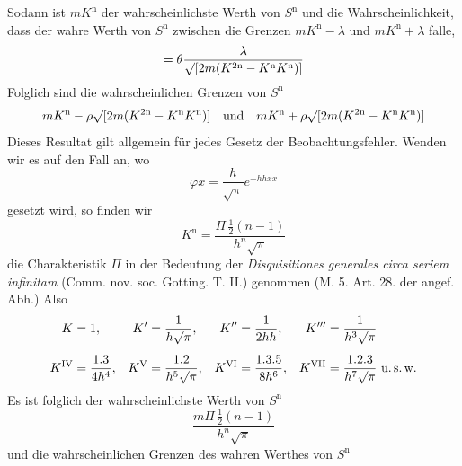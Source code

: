 Sodann ist \(mK^{\mathrm n}\) der wahrscheinlichste Werth von \(S^{\mathrm n}\) und die Wahrscheinlichkeit, dass der wahre Werth von \(S^{\mathrm n}\) zwischen die Grenzen \(mK^{\mathrm n}-\lambda\) und \(mK^{\mathrm n}+\lambda\) falle,
\[
=\theta\frac{\lambda}{\surd[2m(K^{2\mathrm n}-K^{\mathrm n}K^{\mathrm n})]}
\]
Folglich sind die wahrscheinlichen Grenzen von \(S^{\mathrm n}\)
\[
mK^{\mathrm n}-\rho\surd[2m(K^{2\mathrm n}-K^{\mathrm n}K^{\mathrm n})]\quad\text{und}\quad
mK^{\mathrm n}+\rho\surd[2m(K^{2\mathrm n}-K^{\mathrm n}K^{\mathrm n})]
\]
Dieses Resultat gilt allgemein für jedes Gesetz der Beobachtungsfehler. Wenden wir es auf den Fall an, wo
\[
\varphi x=\frac h{\surd\pi}e^{-hhxx}
\]
gesetzt wird, so finden wir
\[
K^{\mathrm n}=\frac{\Pi\,\frac12(n-1)}{h^n\surd\pi}
\]
die Charakteristik \(\Pi\) in der Bedeutung der \textit{Disquisitiones generales circa seriem infinitam} (Comm. nov. soc. Gotting. T. II.) genommen (M. 5. Art. 28. der angef. Abh.) Also
\[
\begin{aligned}
K&=1,&K'&=\frac1{h\surd\pi},&K''&=\frac1{2hh},&K'''&=\frac1{h^3\surd\pi}\\[5pt]
K^{\mathrm{IV}}&=\frac{1.3}{4h^4},&K^{\mathrm{V}}&=\frac{1.2}{h^5\surd\pi},&K^{\mathrm{VI}}&=\frac{1.3.5}{8h^6},&K^{\mathrm{VII}}&=\frac{1.2.3}{h^7\surd\pi}\text{ u.\,s.\,w.}
\end{aligned}
\]
Es ist folglich der wahrscheinlichste Werth von \(S^{\mathrm n}\)
\[
\frac{m\Pi\,\frac12(n-1)}{h^n\surd\pi}
\]
und die wahrscheinlichen Grenzen des wahren Werthes von \(S^{\mathrm n}\)
